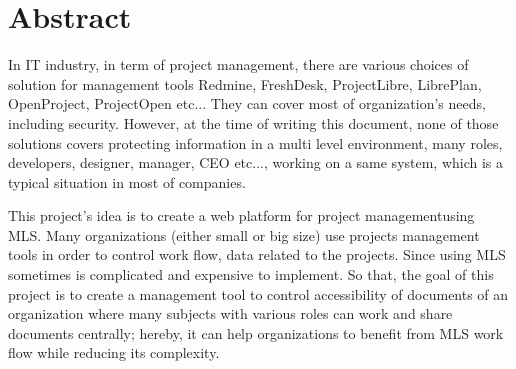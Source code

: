 

\begingroup
\let\clearpage\relax
\let\cleardoublepage\relax
\let\cleardoublepage\relax

\chapter*{Abstract} %

In IT industry, in term of project management, there are various choices of solution for management tools \eg Redmine, FreshDesk, ProjectLibre, LibrePlan, OpenProject, ProjectOpen etc... They can cover most of organization's needs, including security. However, at the time of writing this document, none of those solutions covers protecting information in a multi level environment, \ie many roles, \eg developers, designer, manager, CEO etc..., working on a same system, which is a typical situation in most of companies. 

This project's idea is to create a web platform for project managementusing MLS. Many organizations (either small or big size) use projects management tools in order to control work flow, data related to the projects. Since using MLS sometimes is complicated and expensive to implement. So that, the goal of this project is to create a management tool to control accessibility of documents of an organization where many subjects with various roles can work and share documents centrally; hereby, it can help organizations to benefit from MLS work flow while reducing its complexity.

 \endgroup			

\vfill

